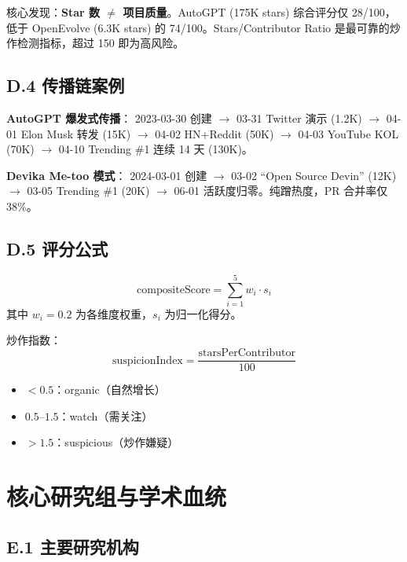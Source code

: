 核心发现：\textbf{Star 数 $\neq$ 项目质量}。AutoGPT (175K stars) 综合评分仅 28/100，低于 OpenEvolve (6.3K stars) 的 74/100。Stars/Contributor Ratio 是最可靠的炒作检测指标，超过 150 即为高风险。

\subsection*{D.4 传播链案例}

\textbf{AutoGPT 爆发式传播}：
2023-03-30 创建 $\to$ 03-31 Twitter 演示 (1.2K) $\to$ 04-01 Elon Musk 转发 (15K) $\to$ 04-02 HN+Reddit (50K) $\to$ 04-03 YouTube KOL (70K) $\to$ 04-10 Trending \#1 连续 14 天 (130K)。

\textbf{Devika Me-too 模式}：
2024-03-01 创建 $\to$ 03-02 ``Open Source Devin'' (12K) $\to$ 03-05 Trending \#1 (20K) $\to$ 06-01 活跃度归零。纯蹭热度，PR 合并率仅 38\%。

\subsection*{D.5 评分公式}

\begin{equation}
\mathrm{compositeScore} = \sum_{i=1}^{5} w_i \cdot s_i
\end{equation}
其中 $w_i = 0.2$ 为各维度权重，$s_i$ 为归一化得分。

炒作指数：
\begin{equation}
\mathrm{suspicionIndex} = \frac{\mathrm{starsPerContributor}}{100}
\end{equation}
\begin{itemize}
\item $< 0.5$：organic（自然增长）
\item $0.5$--$1.5$：watch（需关注）
\item $> 1.5$：suspicious（炒作嫌疑）
\end{itemize}

\section{核心研究组与学术血统}\label{app:researchers}

\subsection*{E.1 主要研究机构}

